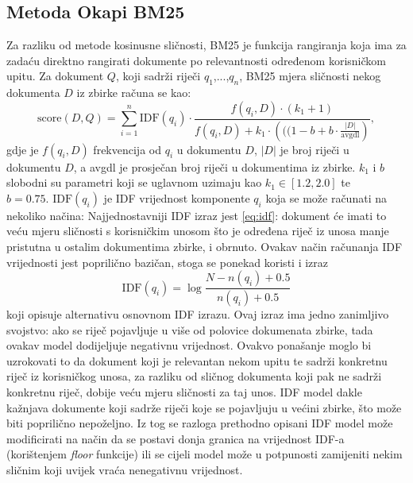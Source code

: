 \documentclass[times, utf8, zavrsni]{fer}
\begin{document}
\subsection{Metoda Okapi BM25}
Za razliku od metode kosinusne sličnosti, BM25 je funkcija rangiranja koja ima za zadaću direktno rangirati dokumente po relevantnosti određenom korisničkom upitu. Za dokument $Q$, koji sadrži riječi $q_{1}$,...,$q_{n}$, BM25 mjera sličnosti nekog dokumenta $D$ iz zbirke računa se kao:
\begin{equation}
{\displaystyle {\text{score}}(D,Q)=\sum _{i=1}^{n}{\text{IDF}}(q_{i})\cdot {\frac {f(q_{i},D)\cdot (k_{1}+1)}{f(q_{i},D)+k_{1}\cdot \left(((1-b+b\cdot {\frac {|D|}{\text{avgdl}}}\right)}},}
\end{equation}
gdje je ${\displaystyle f(q_{i},D)}$	 frekvencija od ${\displaystyle q_{i}}$ u dokumentu $D$, ${\displaystyle |D|}$ je broj riječi u dokumentu $D$, a avgdl je prosječan broj riječi u dokumentima iz zbirke. ${\displaystyle k_{1}}$ i $b$ slobodni su parametri koji se uglavnom uzimaju kao ${\displaystyle k_{1}\in [1.2,2.0]}$ te ${\displaystyle b=0.75}.{\displaystyle {\text{ IDF}}(q_{i})}$ je IDF vrijednost komponente ${\displaystyle q_{i}}$ koja se može računati na nekoliko načina:
Najjednostavniji IDF izraz jest \ref{eq:idf}: dokument će imati to veću mjeru sličnosti s korisničkim unosom što je određena riječ iz unosa manje pristutna u ostalim dokumentima zbirke, i obrnuto. Ovakav način računanja IDF vrijednosti jest poprilično bazičan, stoga se ponekad koristi i izraz
\begin{equation}
\text{IDF}(q_i) = \log \frac{N - n(q_i) + 0.5}{n(q_i) + 0.5}
\label{idf2}
\end{equation}
koji opisuje alternativu osnovnom IDF izrazu. Ovaj izraz ima jedno zanimljivo svojstvo: ako se riječ pojavljuje u više od polovice dokumenata zbirke, tada ovakav model dodijeljuje negativnu vrijednost. Ovakvo ponašanje moglo bi uzrokovati to da dokument koji je relevantan nekom upitu te sadrži konkretnu riječ iz korisničkog unosa, za razliku od sličnog dokumenta koji pak ne sadrži konkretnu riječ, dobije veću mjeru sličnosti za taj unos. IDF model dakle kažnjava dokumente koji sadrže riječi koje se pojavljuju u većini zbirke, što može biti poprilično nepoželjno. Iz tog se razloga prethodno opisani IDF model može modificirati na način da se postavi donja granica na vrijednost IDF-a (korištenjem \textit{floor} funkcije) ili se cijeli model može u potpunosti zamijeniti nekim sličnim koji uvijek vraća nenegativnu vrijednost.
\end{document}

